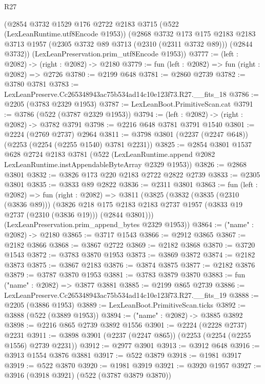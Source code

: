 \begin{lexlean}{R27}
\begin{coremodule}
    (@2854
      @3732
      @1529
      @176
      @2722
      @2183
      @3715
      (@522 (LexLeanRuntime.utf8Encode @1953))
      (@2868
        @3732
        @173
        @175
        @2183
        @2183
        @3713
        @1957
        (@2305 @3732 @89 @3713 (@2310 (@2311 @3732 @89)))
        (@2844 @3732))
      (LexLeanPreservation.prim_utf8Encode @1953))
@3777 := (left : @2082) -> (right : @2082) -> @2180
@3779 := fun (left : @2082) => fun (right : @2082) => @2726
@3780 := @2199 @648
@3781 := @2860 @2739
@3782 := @3780 @3781
@3783 := LexLeanPreserve.Cc265348943ac75b534ad14c10e123f73.R27.__fits_18
@3786 := @2205 (@3783 @2329 @1953)
@3787 := LexLeanBoot.PrimitiveScan.cat
@3791 := @3786 (@522 (@3787 @2329 @1953))
@3794 := (left : @2082) -> (right : @2082) -> @3782 @3791
@3798 := @2216 @648 @3781 @3791 @1540
@3801 := @2224 (@2769 @2737) @2964
@3811 := @3798 @3801 (@2237 (@2247 @648)) (@2253 (@2254 (@2255 @1540) @3781 @2231))
@3825 := @2854
    @3801
    @1537
    @628
    @2724
    @2183
    @3781
    (@522 (LexLeanRuntime.append @2082 LexLeanRuntime.instAppendableByteArray @2329 @1953))
@3826 := @2868 @3801
@3832 := @3826 @173 @220 @2183 @2722 @2822 @2739
@3833 := @2305 @3801
@3835 := @3833 @89 @2822
@3836 := @2311 @3801
@3863 := fun (left : @2082) =>
  fun (right : @2082) =>
  @3811
    (@3825
      (@3832
        (@3835 (@2310 (@3836 @89)))
        (@3826
          @218
          @175
          @2183
          @2183
          @2737
          @1957
          (@3833 @19 @2737 (@2310 (@3836 @19)))
          (@2844 @3801)))
      (LexLeanPreservation.prim_append_bytes @2329 @1953))
@3864 := ("name" : @2082) -> @2180
@3865 := @3717 @1543
@3866 := @2912 @3865
@3867 := @2182 @3866
@3868 := @3867 @2722
@3869 := @2182 @3868
@3870 := @3720 @1543
@3872 := @3783 @3870 @1953
@3873 := @3869 @3872
@3874 := @2182 @3873
@3875 := @3867 @2183
@3876 := @3874 @3875
@3877 := @2182 @3876
@3879 := @3787 @3870 @1953
@3881 := @3783 @3879 @3870
@3883 := fun ("name" : @2082) => @3877 @3881
@3885 := @2199 @865 @2739
@3886 := LexLeanPreserve.Cc265348943ac75b534ad14c10e123f73.R27.__fits_19
@3888 := @2205 (@3886 @1953)
@3889 := LexLeanBoot.PrimitiveScan.ticks
@3892 := @3888 (@522 (@3889 @1953))
@3894 := ("name" : @2082) -> @3885 @3892
@3898 := @2216 @865 @2739 @3892 @1556
@3901 := @2224 (@2228 @2737) @2231
@3911 := @3898 @3901 (@2237 (@2247 @865)) (@2253 (@2254 (@2255 @1556) @2739 @2231))
@3912 := @2977 @3901
@3913 := @3912 @648
@3916 := @3913 @1554 @3876 @3881
@3917 := @522 @3879
@3918 := @1981 @3917
@3919 := @522 @3870
@3920 := @1981 @3919
@3921 := @3920 @1957
@3927 := @3916 (@3918 @3921) (@522 (@3787 @3879 @3870))

\end{coremodule}
\end{lexlean}

